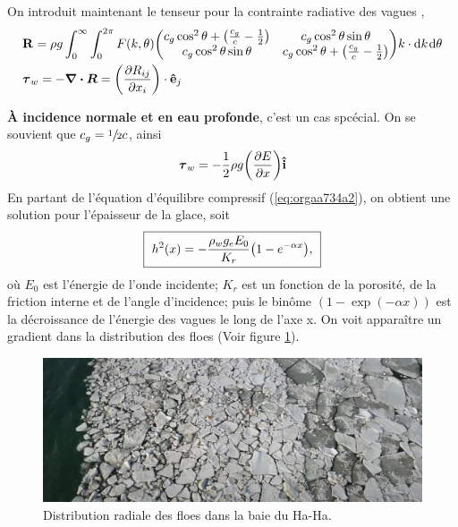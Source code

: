 \documentclass[10pt]{article}
\numberwithin{equation}{section}
\newcommand{\evf}{\vb{\hat{e}}}
\newcommand{\ivf}{\vb{\hat{i}}}
\newcommand{\pt}{\hspace{1pt}} %
\begin{document}
On introduit maintenant le tenseur pour la contrainte radiative des vagues  \autocite[voir][]{longuet1964radiation},
\begin{align}
   & \vb{R} = \rho g \int_0^\infty\int_0^{2\pi} F(k,\theta)
     \qty(\begin{matrix}
       c_g \cos^2 \theta + \qty(\frac{c_g}{c} - \frac{1}{2}) & c_g \cos^2 \theta \sin \theta \\
       c_g \cos^2 \theta \sin\theta & c_g \cos^2 \theta + \qty(\frac{c_g}{c} - \frac{1}{2})
     \end{matrix})
   k \cdot \dd k\pt \dd\theta\\
   & \boldsymbol{\tau}_w = - \divergence{\boldsymbol{R}} = \qty(\pdv{R_{ij}}{x_i})\cdot \evf_j
\end{align}

\textbf{À incidence normale et en eau profonde}, c'est un cas spcécial.
On se souvient que \(c_g = \sfrac{1}{2} c\), ainsi
\begin{equation}
   \boldsymbol{\tau}_w = -\frac{1}{2}\rho g \qty(\pdv{E}{x}) \ivf
\end{equation}
En partant de l'équation d'équilibre compressif (\ref{eq:orgaa734a2}), on obtient une solution pour l'épaisseur de la glace, soit
\begin{equation}
   \boxed{\ h^2(x) = - \frac{\rho_w g_e E_0}{K_r}\qty(1-e^{-\alpha x}),\ }
\end{equation}
où \(E_0\) est l'énergie de l'onde incidente; \(K_r\) est un fonction de la porosité, de la friction interne et de l'angle d'incidence; puis le binôme \((1-\exp(-\alpha x))\) est la décroissance de l'énergie des vagues le long de l'axe x.
On voit apparaître un gradient dans la distribution des floes (Voir figure \ref{fig:org382a1e2}).

\begin{figure}[htbp]
\centering
\includegraphics[width=.9\linewidth]{Figures/photos/gradient_floes.png}
\caption{\label{fig:org382a1e2}Distribution radiale des floes dans la baie du Ha-Ha.}
\end{figure}
\end{document}
